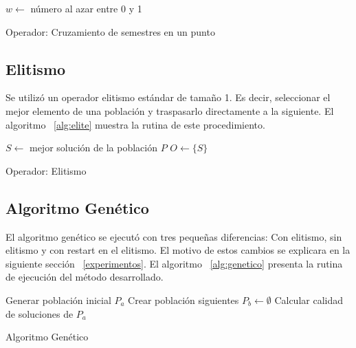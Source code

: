 \documentclass[letter, 10pt]{article}
\begin{document}
\begin{algorithm}[H]
\SetLine
{}
$w \gets$ número al azar entre 0 y 1 \;

\caption{Operador: Cruzamiento de semestres en un punto}
\label{alg:cruz}
\end{algorithm}

\subsection{Elitismo}
Se utilizó un operador elitismo estándar de tamaño 1. Es decir, seleccionar el
mejor elemento de una población y traspasarlo directamente a la siguiente.  El
algoritmo ~\ref{alg:elite} muestra la rutina de este procedimiento.

\begin{algorithm}[H]
\SetLine
{}

$S \gets$ mejor solución de la población $P$ \;
$O \gets \{S\}$ \;

\caption{Operador: Elitismo}
\label{alg:elite}
\end{algorithm}

\subsection{Algoritmo Genético}
El algoritmo genético se ejecutó con tres pequeñas diferencias: Con elitismo,
sin elitismo y con restart en el elitismo.  El motivo de estos cambios se
explicara en la siguiente sección ~\ref{experimentos}. El algoritmo
~\ref{alg:genetico} presenta la rutina de ejecución del método desarrollado.

\begin{algorithm}[H]
\SetLine
{}

Generar población inicial $P_{a}$ \;
Crear población siguientes $P_{b} \gets \emptyset$ \;
Calcular calidad de soluciones de $P_{a}$ \;
\caption{Algoritmo Genético}
\label{alg:genetico}
\end{algorithm}
\end{document}
